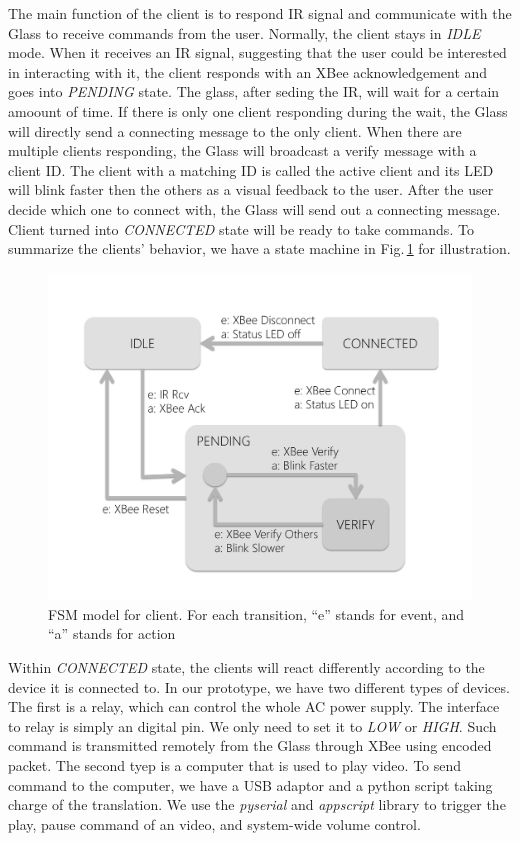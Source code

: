 The main function of the client is to respond IR signal and communicate with the Glass to receive commands from the user. Normally, the client stays in {\it IDLE} mode. When it receives an IR signal, suggesting that the user could be interested in interacting with it, the client responds with an XBee acknowledgement and goes into {\it PENDING} state. The glass, after seding the IR, will wait for a certain amoount of time. If there is only one client responding during the wait, the Glass will directly send a connecting message to the only client. When there are multiple clients responding, the Glass will broadcast a verify message with a client ID. The client with a matching ID is called the active client and its LED will blink faster then the others as a visual feedback to the user. After the user decide which one to connect with, the Glass will send out a connecting message. Client turned into {\it CONNECTED} state will be ready to take commands. To summarize the clients' behavior, we have a state machine in Fig.\,\ref{fig:clientFSM} for illustration.

\begin{figure}
  \centering
  \includegraphics[width=\linewidth]{../figs/clientFSM.pdf}
  \caption{FSM model for client. For each transition, ``e'' stands for event, and ``a'' stands for action}
  \label{fig:clientFSM}
\end{figure}

Within {\it CONNECTED} state, the clients will react differently according to the device it is connected to. In our prototype, we have two different types of devices. The first is a relay, which can control the whole AC power supply. The interface to relay is simply an digital pin. We only need to set it to {\it LOW} or {\it HIGH}. Such command is transmitted remotely from the Glass through XBee using encoded packet. The second tyep is a computer that is used to play video. To send command to the computer, we have a USB adaptor and a python script taking charge of the translation. We use the {\it pyserial} and {\it appscript} library to trigger the play, pause command of an video, and system-wide volume control.

